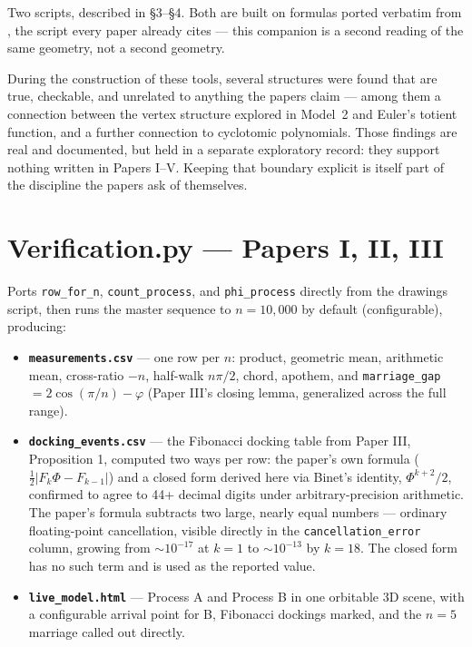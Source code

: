 \documentclass[10pt,a4paper]{article}
\newcommand{\code}[1]{\texttt{#1}}
\begin{document}
Two scripts, described in \S3--\S4. Both are built on formulas ported
verbatim from \texttt{},
the script every paper already cites --- this companion is a second
reading of the same geometry, not a second geometry.

During the construction of these tools, several structures were found
that are true, checkable, and unrelated to anything the papers claim ---
among them a connection between the vertex structure explored in Model~2
and Euler's totient function, and a further connection to cyclotomic
polynomials. Those findings are real and documented, but held in a
separate exploratory record: they support nothing written in Papers I--V.
Keeping that boundary explicit is itself part of the discipline the
papers ask of themselves.

\section{Verification.py --- Papers I, II, III}

Ports \code{row\_for\_n}, \code{count\_process}, and \code{phi\_process}
directly from the drawings script, then runs the master sequence to
$n=10{,}000$ by default (configurable), producing:

\begin{itemize}
\item \textbf{\code{measurements.csv}} --- one row per $n$: product,
geometric mean, arithmetic mean, cross-ratio $-n$, half-walk $n\pi/2$,
chord, apothem, and \code{marriage\_gap} $= 2\cos(\pi/n) - \varphi$
(Paper III's closing lemma, generalized across the full range).
\item \textbf{\code{docking\_events.csv}} --- the Fibonacci docking table
from Paper III, Proposition 1, computed two ways per row: the paper's own
formula ($\tfrac12|F_k\Phi - F_{k-1}|$) and a closed form derived here via
Binet's identity, $\Phi^{k+2}/2$, confirmed to agree to 44+ decimal
digits under arbitrary-precision arithmetic. The paper's formula
subtracts two large, nearly equal numbers --- ordinary floating-point
cancellation, visible directly in the \code{cancellation\_error} column,
growing from $\sim 10^{-17}$ at $k=1$ to $\sim 10^{-13}$ by $k=18$. The
closed form has no such term and is used as the reported value.
\item \textbf{\code{live\_model.html}} --- Process A and Process B in one
orbitable 3D scene, with a configurable arrival point for B, Fibonacci
dockings marked, and the $n=5$ marriage called out directly.
\end{itemize}
\end{document}
